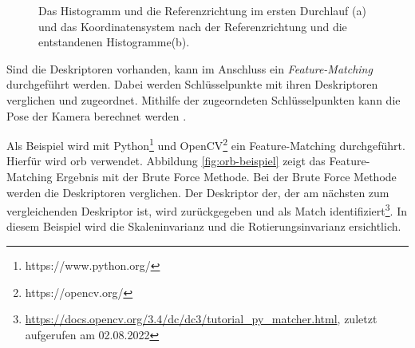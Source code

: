 \begin{figure}[H]
    \centering
    \qquad
    \caption[Das Histogramm und die Referenzrichtung im ersten Durchlauf (a) und das Koordinatensystem nach der Referenzrichtung und die entstandenen Histogramme(b).]{Das Histogramm und die Referenzrichtung im ersten Durchlauf (a) und das Koordinatensystem nach der Referenzrichtung und die entstandenen Histogramme(b)\protect\footnotemark.}%
    \label{fig:tracking-sift-richtungen}
\end{figure}



Sind die Deskriptoren vorhanden, kann im Anschluss ein \textit{Feature-Matching} durchgeführt werden. Dabei werden Schlüsselpunkte mit ihren Deskriptoren verglichen und zugeordnet. Mithilfe der zugeorndeten Schlüsselpunkten kann die Pose der Kamera berechnet werden \cite[Dörner(2019)][]{doerner}\cite[Herling und Broll(2011)][]{herling2011}. 

Als Beispiel wird mit Python\footnote{https://www.python.org/} und OpenCV\footnote{https://opencv.org/} ein Feature-Matching durchgeführt. Hierfür wird \acrshort{orb} verwendet. Abbildung \ref*{fig:orb-beispiel} zeigt das Feature-Matching Ergebnis mit der Brute Force Methode. Bei der Brute Force Methode werden die Deskriptoren verglichen. Der Deskriptor der, der am nächsten zum vergleichenden Deskriptor ist, wird zurückgegeben und als Match identifiziert\footnote{\url{https://docs.opencv.org/3.4/dc/dc3/tutorial_py_matcher.html}, zuletzt aufgerufen am 02.08.2022}. In diesem Beispiel wird die Skaleninvarianz und die Rotierungsinvarianz ersichtlich.

